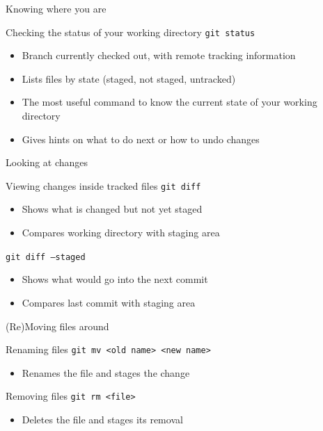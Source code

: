 \documentclass{beamer}
\begin{document}
\begin{frame}{Knowing where you are}
  \begin{block}{Checking the status of your working directory}
    \texttt{git status}
    \begin{itemize}
    \item Branch currently checked out, with remote tracking information
    \item Lists files by state (staged, not staged, untracked)
    \item The most useful command to know the current state of your working directory
    \item Gives hints on what to do next or how to undo changes
    \end{itemize}
  \end{block}
\end{frame}

\begin{frame}{Looking at changes}
  \begin{block}{Viewing changes inside tracked files}
    \texttt{git diff}
    \begin{itemize}
    \item Shows what is changed but not yet staged
    \item Compares working directory with staging area
    \end{itemize}
    \texttt{git diff --staged}
    \begin{itemize}
    \item Shows what would go into the next commit
    \item Compares last commit with staging area
    \end{itemize}
  \end{block}
\end{frame}

\begin{frame}{(Re)Moving files around}
  \begin{block}{Renaming files}
    \texttt{git mv <old name> <new name>}
    \begin{itemize}
    \item Renames the file and stages the change
    \end{itemize}
  \end{block}
  \begin{block}{Removing files}
    \texttt{git rm <file>}
    \begin{itemize}
    \item Deletes the file and stages its removal
    \end{itemize}
  \end{block}
\end{frame}
\end{document}
